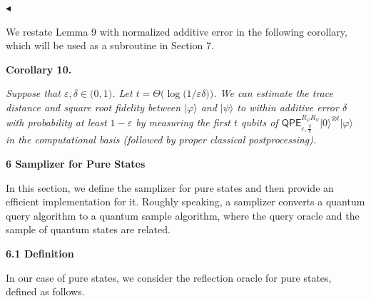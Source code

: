 \documentclass[10pt,a4paper]{article}
\begin{document}
$\blacktriangleleft$\par




We restate Lemma 9 with normalized additive error in the following corollary, which will be used as a subroutine in Section 7.\par





\par\medskip\noindent\textbf{
\textbf{Corollary 10}\textbf{.}
}\par



\emph{Suppose that $\varepsilon,\delta\in\lparen 0,1\rparen$. Let $t=\Theta\lparen\log\lparen 1/\varepsilon\delta\rparen\rparen$.
We can estimate the trace distance and square root fidelity between $\lvert\varphi\rangle$ and $\lvert\psi\rangle$ to within additive error $\delta$ with probability at least $1-\varepsilon$ by measuring the first $t$ qubits of
$\mathsf{QPE}_{\varepsilon,\frac{\delta}{\pi}}^{R_{\varphi}R_{\psi}}\lvert 0\rangle^{\otimes t}\lvert\varphi\rangle$ in the computational basis (followed by proper classical postprocessing).}\par









\par\medskip\noindent\textbf{
6 Samplizer for Pure States}\par




In this section, we define the samplizer for pure states and then provide an efficient implementation for it.
Roughly speaking,
a samplizer converts a quantum query algorithm to a quantum sample algorithm,
where the query oracle and the sample of quantum states are related.\par




\par\medskip\noindent\textbf{
6.1 Definition}\par




In our case of pure states, we consider the reflection oracle for pure states, defined as follows.\par
\end{document}
